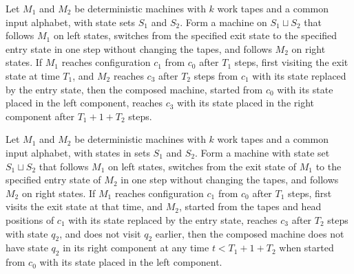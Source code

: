 \begin{theorem}
\label{Turing.seamCompTM_run_ofCfg}
\leanok
{}
Let $M_1$ and $M_2$ be deterministic machines with $k$ work tapes and a common input
alphabet, with state sets $S_1$ and $S_2$. Form a machine on $S_1\sqcup S_2$ that
follows $M_1$ on left states, switches from the specified exit state to the specified
entry state in one step without changing the tapes, and follows $M_2$ on right states.
If $M_1$ reaches configuration $c_1$ from $c_0$ after $T_1$ steps, first visiting the
exit state at time $T_1$, and $M_2$ reaches $c_3$ after $T_2$ steps from $c_1$ with its
state replaced by the entry state, then the composed machine, started from $c_0$ with
its state placed in the left component, reaches $c_3$ with its state placed in the right
component after $T_1+1+T_2$ steps.
\end{theorem}

\begin{theorem}
\label{Turing.seamCompTM_firstReturn_ofCfg}
\leanok
{}
Let $M_1$ and $M_2$ be deterministic machines with $k$ work tapes and a common input
alphabet, with states in sets $S_1$ and $S_2$. Form a machine with state set $S_1\sqcup
S_2$ that follows $M_1$ on left states, switches from the exit state of $M_1$ to the
specified entry state of $M_2$ in one step without changing the tapes, and follows $M_2$
on right states. If $M_1$ reaches configuration $c_1$ from $c_0$ after $T_1$ steps,
first visits the exit state at that time, and $M_2$, started from the tapes and head
positions of $c_1$ with its state replaced by the entry state, reaches $c_3$ after $T_2$
steps with state $q_2$, and does not visit $q_2$ earlier, then the composed machine does
not have state $q_2$ in its right component at any time $t<T_1+1+T_2$ when started from
$c_0$ with its state placed in the left component.
\end{theorem}


